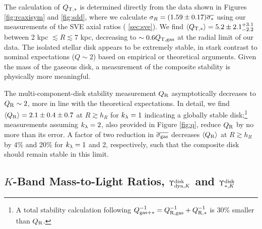 \documentclass[apj,iop,numberedappendix]{emulateapj}
\begin{document}
The calculation of $Q_{{\rm T,}\ast}$ is determined directly from the data shown in Figures
\ref{fig:rcaxisym} and \ref{fig:sdd}, where we calculate $\sigma_R = (1.59\pm0.17)
\overline{\sigma_{\ast}}$ using our measurements of the SVE axial ratios (\sect
\ref{sec:sve}).  We find $\langle Q_{{\rm T,}\ast} \rangle = 5.2\pm2.1^{+3.1}_{-2.2}$ between 2
kpc $\lesssim R\lesssim 7$ kpc, decreasing to $\sim 0.6 Q_{\rm T,gas}$ at the radial
limit of our data.  The isolated stellar disk appears to be extremely stable, in
stark contrast to nominal expectations ($Q\sim2$) based on empirical
\citep[e.g.,][]{1993A&A...275...16B} or theoretical
\citep[e.g.,][]{1984ApJ...282...61S} arguments.  Given the mass of the gaseous
disk, a measurement of the composite stability is physically more meaningful.

The multi-component-disk stability measurement $Q_{\rm R}$ asymptotically decreases to
$Q_{\rm R}\sim2$, more in line with the theoretical expectations.  In detail, we find
$\langle Q_{\rm R} \rangle = 2.1\pm0.4\pm0.7$ at $R\gtrsim h_R$ for $k_{\lambda}=1$ indicating a
globally stable disk;\footnote{
%
A total stability calculation following $Q^{-1}_{{\rm gas}+\ast} = Q_{\rm R,gas}^{-1} +
Q_{{\rm R,}\ast}^{-1}$ \citep{1994ApJ...427..759W} is 30\% smaller than $Q_{\rm R}$.
%
} measurements assuming $k_{\lambda} = 2$, also provided in Figure \ref{fig:q}, reduce
$Q_{\rm R}$ by no more than its error.  A factor of two reduction in $\overline{\sigma_{\rm gas}}$
decreases $\langle Q_{\rm R} \rangle$ at $R\gtrsim h_R$ by 4\% and 20\% for $k_{\lambda}=1$ and 2,
respectively, such that the composite disk should remain stable in this limit.

\subsection{$K$-Band Mass-to-Light Ratios, $\Upsilon_{{\rm dyn},K}^{\rm disk}$ and $\Upsilon_{\ast,K}^{\rm disk}$}
\label{sec:ml}
\end{document}
